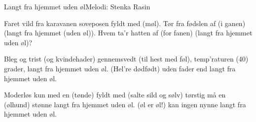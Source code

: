 \begin{sang}{Langt fra hjemmet uden øl}{Melodi: Stenka Rasin}

\begin{vers}
Faret vild fra karavanen
soveposen fyldt med (møl).
Tør fra fødslen af (i ganen)
(langt fra hjemmet (uden øl)).
Hvem ta'r hatten af (for fanen)
(langt fra hjemmet uden øl)?
\end{vers}
\begin{vers}
Bleg og trist (og kvindehader)
gennemsvedt (til hest med føl),
temp'raturen (40) grader,
langt fra hjemmet uden øl.
(Hel're dødfødt) uden fader
end langt fra hjemmet uden øl.
\end{vers}
\begin{vers}
Moderløs kun med en (tønde)
fyldt med (salte sild og sølv)
tørstig må en (ølhund) stønne
langt fra hjemmet uden øl.
(øl er øl!) kan ingen nynne
langt fra hjemmet uden øl.
\end{vers}

\laps

\end{sang}